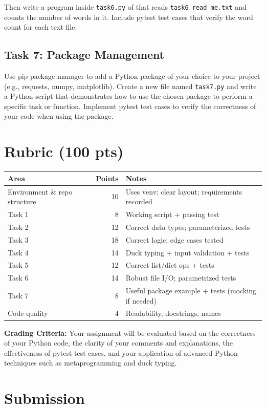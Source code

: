 \documentclass{article}
\begin{document}
Then write a program inside \verb|task6.py| of that reads \verb|task6_read_me.txt| and counts the number of words in it. Include pytest test cases that verify the word count for each text file.

\subsection{Task 7: Package Management}
Use pip package manager to add a Python package of your choice to your project (e.g., requests, numpy, matplotlib). Create a new file named \verb|task7.py| and write a Python script that demonstrates how to use the chosen package to perform a specific task or function. Implement pytest test cases to verify the correctness of your code when using the package.

\section{Rubric (100 pts)}
\begin{center}
\begin{tabular}{l r l}
\hline
\textbf{Area} & \textbf{Points} & \textbf{Notes} \\
\hline
Environment \& repo structure & 10 & Uses venv; clear layout; requirements recorded \\
Task 1 & 8 & Working script + passing test \\
Task 2 & 12 & Correct data types; parameterized tests \\
Task 3 & 18 & Correct logic; edge cases tested \\
Task 4 & 14 & Duck typing + input validation + tests \\
Task 5 & 12 & Correct list/dict ops + tests \\
Task 6 & 14 & Robust file I/O; parametrized tests \\
Task 7 & 8 & Useful package example + tests (mocking if needed) \\
Code quality & 4 & Readability, docstrings, names \\
\hline
\end{tabular}
\end{center}
\textbf{Grading Criteria:} Your assignment will be evaluated based on the correctness of your Python code, the clarity of your comments and explanations, the effectiveness of pytest test cases, and your application of advanced Python techniques such as metaprogramming and duck typing.


\section{Submission}
\end{document}
